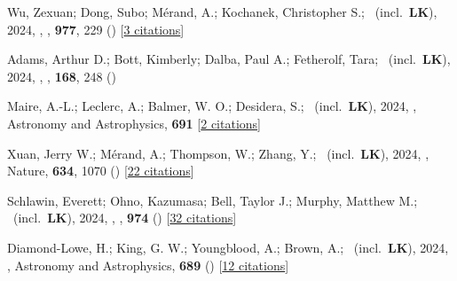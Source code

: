 \item[{\color{numcolor}\scriptsize127}] Wu, Zexuan; Dong, Subo; M{\'e}rand, A.; Kochanek, Christopher S.; \etal\ (incl.\ \textbf{LK}), 2024, , \apj, \textbf{977}, 229 () [\href{https://ui.adsabs.harvard.edu/abs/2024ApJ...977..229W}{3 citations}]

\item[{\color{numcolor}\scriptsize126}] Adams, Arthur D.; Bott, Kimberly; Dalba, Paul A.; Fetherolf, Tara; \etal\ (incl.\ \textbf{LK}), 2024, , \aj, \textbf{168}, 248 ()

\item[{\color{numcolor}\scriptsize125}] Maire, A.-L.; Leclerc, A.; Balmer, W. O.; Desidera, S.; \etal\ (incl.\ \textbf{LK}), 2024, , Astronomy and Astrophysics, \textbf{691} [\href{https://ui.adsabs.harvard.edu/abs/2024A&A...691A.263M}{2 citations}]

\item[{\color{numcolor}\scriptsize124}] Xuan, Jerry W.; M{\'e}rand, A.; Thompson, W.; Zhang, Y.; \etal\ (incl.\ \textbf{LK}), 2024, , Nature, \textbf{634}, 1070 () [\href{https://ui.adsabs.harvard.edu/abs/2024Natur.634.1070X}{22 citations}]

\item[{\color{numcolor}\scriptsize123}] Schlawin, Everett; Ohno, Kazumasa; Bell, Taylor J.; Murphy, Matthew M.; \etal\ (incl.\ \textbf{LK}), 2024, , \apj, \textbf{974} () [\href{https://ui.adsabs.harvard.edu/abs/2024ApJ...974L..33S}{32 citations}]

\item[{\color{numcolor}\scriptsize122}] Diamond-Lowe, H.; King, G. W.; Youngblood, A.; Brown, A.; \etal\ (incl.\ \textbf{LK}), 2024, , Astronomy and Astrophysics, \textbf{689} () [\href{https://ui.adsabs.harvard.edu/abs/2024A&A...689A..48D}{12 citations}]

